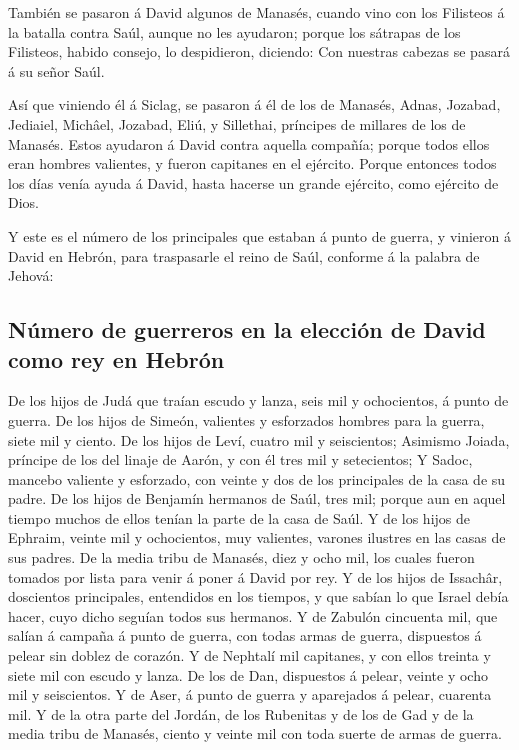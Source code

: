  También se pasaron á David algunos de Manasés, cuando vino
con los Filisteos á la batalla contra Saúl, aunque no les ayudaron;
porque los sátrapas de los Filisteos, habido consejo, lo despidieron,
diciendo: Con nuestras cabezas se pasará á su señor Saúl.

 Así que viniendo él á Siclag, se pasaron á él de los de
Manasés, Adnas, Jozabad, Jediaiel, Michâel, Jozabad, Eliú, y Sillethai,
príncipes de millares de los de Manasés.  Estos ayudaron á
David contra aquella compañía; porque todos ellos eran hombres
valientes, y fueron capitanes en el ejército.  Porque
entonces todos los días venía ayuda á David, hasta hacerse un grande
ejército, como ejército de Dios.

 Y este es el número de los principales que estaban á punto
de guerra, y vinieron á David en Hebrón, para traspasarle el reino de
Saúl, conforme á la palabra de Jehová:

\hypertarget{nuxfamero-de-guerreros-en-la-elecciuxf3n-de-david-como-rey-en-hebruxf3n}{%
\subsection{Número de guerreros en la elección de David como rey en
Hebrón}\label{nuxfamero-de-guerreros-en-la-elecciuxf3n-de-david-como-rey-en-hebruxf3n}}

 De los hijos de Judá que traían escudo y lanza, seis mil y
ochocientos, á punto de guerra.  De los hijos de Simeón,
valientes y esforzados hombres para la guerra, siete mil y ciento.
 De los hijos de Leví, cuatro mil y seiscientos;
 Asimismo Joiada, príncipe de los del linaje de Aarón, y
con él tres mil y setecientos;  Y Sadoc, mancebo valiente y
esforzado, con veinte y dos de los principales de la casa de su padre.
 De los hijos de Benjamín hermanos de Saúl, tres mil;
porque aun en aquel tiempo muchos de ellos tenían la parte de la casa de
Saúl.  Y de los hijos de Ephraim, veinte mil y ochocientos,
muy valientes, varones ilustres en las casas de sus padres.
 De la media tribu de Manasés, diez y ocho mil, los cuales
fueron tomados por lista para venir á poner á David por rey.
 Y de los hijos de Issachâr, doscientos principales,
entendidos en los tiempos, y que sabían lo que Israel debía hacer, cuyo
dicho seguían todos sus hermanos.  Y de Zabulón cincuenta
mil, que salían á campaña á punto de guerra, con todas armas de guerra,
dispuestos á pelear sin doblez de corazón.  Y de Nephtalí
mil capitanes, y con ellos treinta y siete mil con escudo y lanza.
 De los de Dan, dispuestos á pelear, veinte y ocho mil y
seiscientos.  Y de Aser, á punto de guerra y aparejados á
pelear, cuarenta mil.  Y de la otra parte del Jordán, de
los Rubenitas y de los de Gad y de la media tribu de Manasés, ciento y
veinte mil con toda suerte de armas de guerra.

